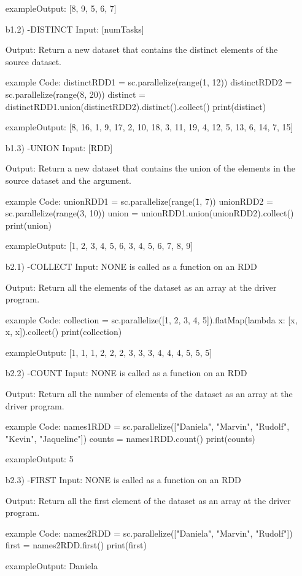 \documentclass[11pt,a4paper]{scrartcl}
\begin{document}
\begin{itemize}
		exampleOutput:
		[8, 9, 5, 6, 7]
		
	\item[b1.2)]
		-DISTINCT
		Input:
		[numTasks]
		
		Output:
		Return a new dataset that contains the distinct elements of the source dataset.
		
		example Code:
		distinctRDD1 = sc.parallelize(range(1, 12))
    		distinctRDD2 = sc.parallelize(range(8, 20))
    		distinct = distinctRDD1.union(distinctRDD2).distinct().collect()
    		print(distinct)
		
		exampleOutput:
		[8, 16, 1, 9, 17, 2, 10, 18, 3, 11, 19, 4, 12, 5, 13, 6, 14, 7, 15]
		
	\item[b1.3)]
		-UNION
		Input:
		[RDD]
		
		Output:
		Return a new dataset that contains the union of the elements in the source dataset and the argument.
		
		example Code:
		unionRDD1 = sc.parallelize(range(1, 7))
    		unionRDD2 = sc.parallelize(range(3, 10))
    		union = unionRDD1.union(unionRDD2).collect()
    		print(union)
		
		exampleOutput:
		[1, 2, 3, 4, 5, 6, 3, 4, 5, 6, 7, 8, 9]
		
	\item[b2.1)]
		-COLLECT
		Input:
		NONE is called as a function on an RDD
		
		Output:
		Return all the elements of the dataset as an array at the driver program.
		
		example Code:
		collection = sc.parallelize([1, 2, 3, 4, 5]).flatMap(lambda x: [x, x, x]).collect()
    		print(collection)
		
		exampleOutput:
		[1, 1, 1, 2, 2, 2, 3, 3, 3, 4, 4, 4, 5, 5, 5]
		
	\item[b2.2)]
		-COUNT
		Input:
		NONE is called as a function on an RDD
		
		Output:
		Return all the number of elements of the dataset as an array at the driver program.
		
		example Code:
		names1RDD = sc.parallelize(["Daniela", "Marvin", "Rudolf", "Kevin", "Jaqueline"])
    		counts = names1RDD.count()
    		print(counts)
		
		exampleOutput:
		5
		
	\item[b2.3)]
		-FIRST
		Input:
		NONE is called as a function on an RDD
		
		Output:
		Return all the first element of the dataset as an array at the driver program.
		
		example Code:
		names2RDD = sc.parallelize(["Daniela", "Marvin", "Rudolf"])
   	 	first = names2RDD.first()
    		print(first)
		
		exampleOutput:
		Daniela
		
	\end{itemize}
\end{document}
